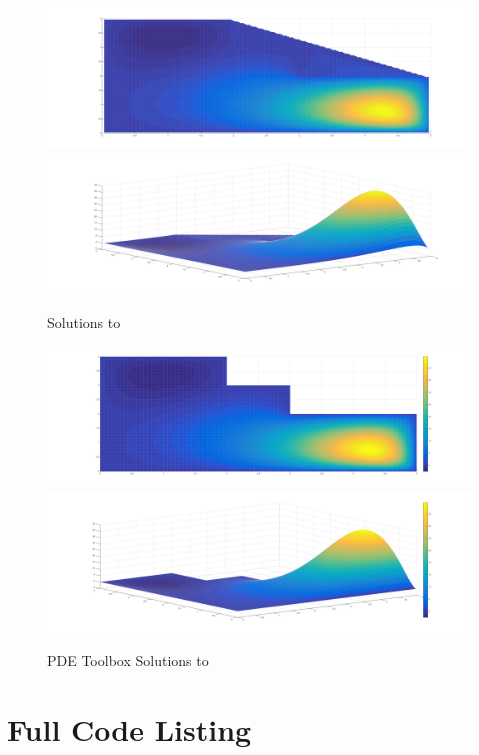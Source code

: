 \documentclass[10pt,a4paper]{article}
\begin{document}
\begin{figure}[H]
\includegraphics[width=\linewidth]{figures/cubic-top.png}
\includegraphics[width=\linewidth]{figures/cubic-iso.png}
\caption{Solutions to }
\label{fig: cubic solutions}
\end{figure}

\begin{figure}[H]
\includegraphics[width=\linewidth]{figures/cubic-top-pdetool.png}
\includegraphics[width=\linewidth]{figures/cubic-iso-pdetool.png}
\caption{PDE Toolbox Solutions to }
\label{fig: pdetool cubic solutions}
\end{figure}

\newpage
\section*{Full Code Listing}

\end{document}
